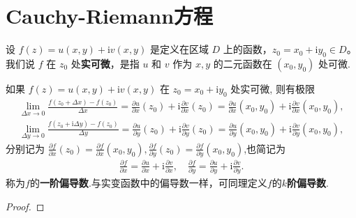 \documentclass[../../main.tex]{subfiles}%
\begin{document}
\section{Cauchy-Riemann方程}

\begin{definition}
设 \( f(z) = u(x,y) + \text{i}v(x,y) \) 是定义在区域 \( D \) 上的函数，\( z_0 = x_0 + \text{i}y_0 \in D \)。我们说 \( f \) 在 \( z_0 \) 处\textbf{实可微}，是指 \( u \) 和 \( v \) 作为 \( x,y \) 的二元函数在 \( (x_0,y_0) \) 处可微.
\end{definition}

\begin{theorem}
如果 $f(z)=u(x,y)+\mathrm{i}v(x,y)$ 在 $z_0=x_0+\mathrm{i}y_0$ 处实可微, 则有极限
\begin{align*}
\lim_{\Delta x\rightarrow 0} \frac{f(z_0+\Delta x)-f(z_0)}{\Delta x}=\frac{\partial u}{\partial x}(z_0)+\mathrm{i}\frac{\partial v}{\partial x}(z_0)=\frac{\partial u}{\partial x}(x_0,y_0)+\mathrm{i}\frac{\partial v}{\partial x}(x_0,y_0),
\end{align*}
\begin{align*}
\lim_{\Delta y\rightarrow 0} \frac{f(z_0+\mathrm{i}\Delta y)-f(z_0)}{\Delta y}=\frac{\partial u}{\partial y}(z_0)+\mathrm{i}\frac{\partial v}{\partial y}(z_0)=\frac{\partial u}{\partial y}(x_0,y_0)+\mathrm{i}\frac{\partial v}{\partial y}(x_0,y_0),
\end{align*}
分别记为 $\frac{\partial f}{\partial x}(z_0)=\frac{\partial f}{\partial x}(x_0,y_0),\frac{\partial f}{\partial y}(z_0)=\frac{\partial f}{\partial y}(x_0,y_0)$,也简记为
\begin{align*}
\frac{\partial f}{\partial x}=\frac{\partial u}{\partial x}+\mathrm{i}\frac{\partial v}{\partial x},\quad \frac{\partial f}{\partial y}=\frac{\partial u}{\partial y}+\mathrm{i}\frac{\partial v}{\partial y}.
\end{align*}
称为$f$的\textbf{一阶偏导数}.与实变函数中的偏导数一样，可同理定义$f$的$k$\textbf{阶偏导数}.
\end{theorem}
\begin{proof}

\end{proof}
\end{document}
